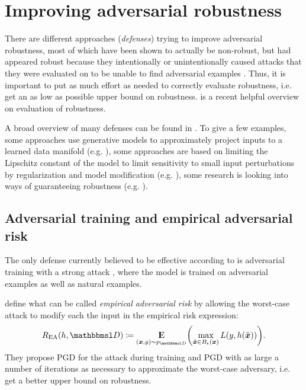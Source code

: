 \documentclass[conference,compsoc]{IEEEtran}
\begin{document}
\section{Improving adversarial robustness}

There are different approaches (\textit{defenses}) trying to improve adversarial robustness, most of which have been shown to actually be non-robust, but had appeared robust because they intentionally or unintentionally caused attacks that they were evaluated on to be unable to find adversarial examples \citep{Carlini:2017:AEANEDBTM,Athalye:2018:OGGFSS,Uesato:2018:ARDEAWA,Carlini:2017:TERNN}. Thus, it is important to put as much effort as needed to correctly evaluate robustness, i.e. get an as low as possible upper bound on robustness. \citep{Carlini:2019:OEAR} is a recent helpful overview on evaluation of robustness. 

A broad overview of many defenses can be found in \citet{Serban:2018:AECCP}. To give a few examples, some approaches use generative models to approximately project inputs to a learned data manifold (e.g. \citet{Samangouei:2018:DGPCAAAUGM}), some approaches are based on limiting the Lipschitz constant of the model to limit sensitivity to small input perturbations by regularization and model modification (e.g. \citet{Qian:2018:L2NNN}), some research is looking into ways of guaranteeing robustness (e.g. \citet{Cohen:2019:CARRS}).

\subsection{Adversarial training and empirical adversarial risk}

The only defense currently believed to be effective according to \citet{Athalye:2018:OGGFSS} is adversarial training \citep{Goodfellow:2014:EHAE} with a strong attack \citep{Madry:2017:TDLMRAA}, where the model is trained on adversarial examples as well as natural examples.

\citet{Madry:2017:TDLMRAA} define what can be called \textit{empirical adversarial risk} by allowing the worst-case attack to modify each the input in the empirical risk expression:
\begin{align}
R_\text{EA}(h,\set D) \coloneqq \E_{(\vec x, y)\sim p_{\set D}} \del{\max_{\tilde{\vec x}\in B_\epsilon(\vec x)} L(y,h(\tilde{\vec x}))} \text{.}
\end{align}
They propose PGD for the attack during training and PGD with as large a number of iterations as necessary to approximate the worst-case adversary, i.e. get a better upper bound on robustness.
\end{document}

